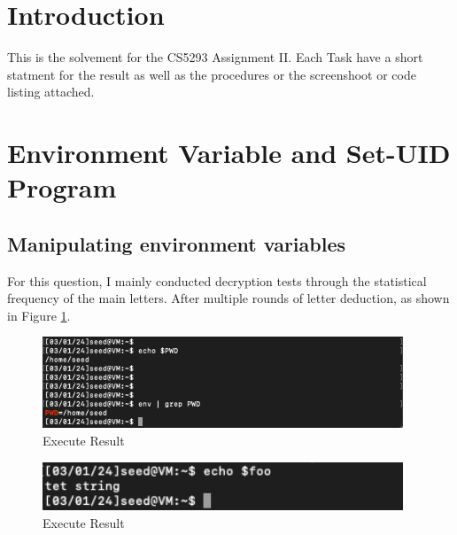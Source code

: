 \documentclass[a4paper]{article}
\begin{document}

{\hypersetup{hidelinks}
\tableofcontents
}
\newpage
\section{Introduction}
This is the solvement for the CS5293 Assignment II. Each Task have a short statment for the result as well as the procedures or the screenshoot or code listing attached.

\section{Environment Variable and Set-UID Program}

\subsection{Manipulating environment variables}\label{sec:task1}

For this question, I mainly conducted decryption tests through the statistical frequency of the main letters. After multiple rounds of letter deduction, as shown in Figure \ref{fig:task1.1}. 

\begin{figure}[h]
    \centering
       \includegraphics[width=0.96\textwidth]{figures/task1/task1.1.png}
    \caption{Execute Result}\label{fig:task1.1}
\end{figure}

\begin{figure}[h]
    \centering
       \includegraphics[width=0.96\textwidth]{figures/task1/task1.2.png}
    \caption{Execute Result}\label{fig:task1.2}
\end{figure}
\end{document}
